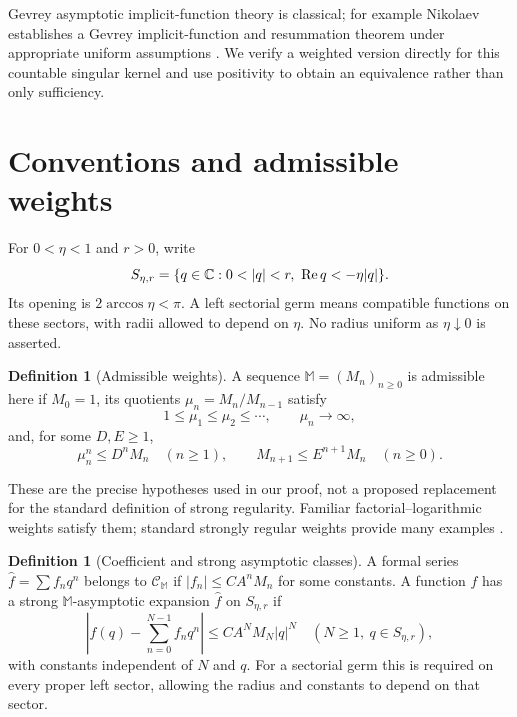 \documentclass[11pt,a4paper]{article}
\numberwithin{equation}{section}
\theoremstyle{definition}\newtheorem{definition}[theorem]{Definition}
\theoremstyle{remark}\newtheorem{remark}[theorem]{Remark}
\newcommand{\M}{\mathbb M}\newcommand{\CM}{\mathcal C_{\M}}
\DeclareMathOperator{\Rea}{Re}
\begin{document}
Gevrey asymptotic implicit-function theory is classical; for example
Nikolaev establishes a Gevrey implicit-function and resummation theorem
under appropriate uniform assumptions \cite{nikolaev}. We verify a
weighted version directly for this countable singular kernel and use
positivity to obtain an equivalence rather than only sufficiency.

\section{Conventions and admissible weights}
\label{sec:weights}
For $0<\eta<1$ and $r>0$, write
\begin{equation}
 S_{\eta,r}=\{q\in\C:0<|q|<r,\ \Rea q<-\eta|q|\}.
 \label{eq:sector}
\end{equation}
Its opening is $2\arccos\eta<\pi$. A left sectorial germ means compatible
functions on these sectors, with radii allowed to depend on $\eta$.
No radius uniform as $\eta\downarrow0$ is asserted.

\begin{definition}[Admissible weights]
A sequence $\M=(M_n)_{n\ge0}$ is admissible here if $M_0=1$, its quotients
$\mu_n=M_n/M_{n-1}$ satisfy
\begin{equation}
 1\le\mu_1\le\mu_2\le\cdots,\qquad \mu_n\longrightarrow\infty,
 \label{eq:quotients}
\end{equation}
and, for some $D,E\ge1$,
\begin{equation}
 \mu_n^n\le D^nM_n\quad(n\ge1),\qquad
 M_{n+1}\le E^{n+1}M_n\quad(n\ge0).
 \label{eq:weightconditions}
\end{equation}
\end{definition}
These are the precise hypotheses used in our proof, not a proposed
replacement for the standard definition of strong regularity. Familiar
factorial--logarithmic weights satisfy them; standard strongly regular
weights provide many examples \cite{lms}.

\begin{definition}[Coefficient and strong asymptotic classes]
A formal series $\widehat f=\sum f_nq^n$ belongs to $\CM$ if
$|f_n|\le CA^nM_n$ for some constants. A function $f$ has a strong
$\M$-asymptotic expansion $\widehat f$ on $S_{\eta,r}$ if
\begin{equation}
 \left|f(q)-\sum_{n=0}^{N-1}f_nq^n\right|
 \le CA^NM_N|q|^N\quad(N\ge1,\ q\in S_{\eta,r}),
 \label{eq:strong}
\end{equation}
with constants independent of $N$ and $q$. For a sectorial germ this is
required on every proper left sector, allowing the radius and constants
to depend on that sector.
\end{definition}
\end{document}

